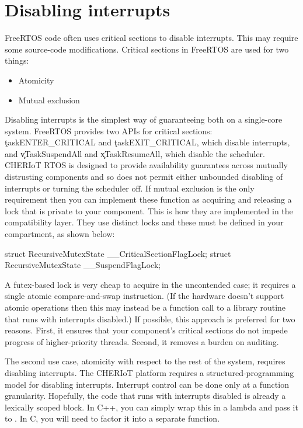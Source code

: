 \section{Disabling interrupts}

FreeRTOS code often uses critical sections to disable interrupts.
This may require some source-code modifications.
Critical sections in FreeRTOS are used for two things:

\begin{itemize}
	\item{Atomicity}
	\item{Mutual exclusion}
\end{itemize}

Disabling interrupts is the simplest way of guaranteeing both on a single-core system.
FreeRTOS provides two APIs for critical sections: \c{taskENTER_CRITICAL} and \c{taskEXIT_CRITICAL}, which disable interrupts, and \c{vTaskSuspendAll} and \c{xTaskResumeAll}, which disable the scheduler.
CHERIoT RTOS is designed to provide availability guarantees across mutually distrusting components and so does not permit either unbounded disabling of interrupts or turning the scheduler off.
If mutual exclusion is the only requirement then you can implement these function as acquiring and releasing a lock that is private to your component.
This is how they are implemented in the compatibility layer.
They use distinct locks and these must be defined in your compartment, as shown below:

\begin{cxxsnippet}
struct RecursiveMutexState __CriticalSectionFlagLock;
struct RecursiveMutexState __SuspendFlagLock;
\end{cxxsnippet}

A futex-based lock is very cheap to acquire in the uncontended case; it requires a single atomic compare-and-swap instruction.
(If the hardware doesn't support atomic operations then this may instead be a function call to a library routine that runs with interrupts disabled.)
If possible, this approach is preferred for two reasons.
First, it ensures that your component's critical sections do not impede progress of higher-priority threads.
Second, it removes a burden on auditing.

The second use case, atomicity with respect to the rest of the system, requires disabling interrupts.
The CHERIoT platform requires a structured-programming model for disabling interrupts.
Interrupt control can be done only at a function granularity.
Hopefully, the code that runs with interrupts disabled is already a lexically scoped block.
In C++, you can simply wrap this in a lambda and pass it to .
In C, you will need to factor it into a separate function.

